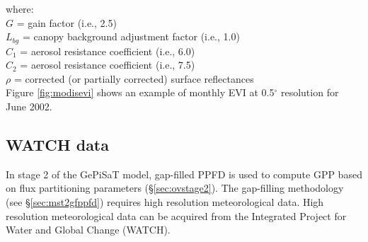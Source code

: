 \noindent where:\\
\indent $G$ = gain factor (i.e., 2.5)\\
\indent $L_{bg}$ = canopy background adjustment factor (i.e., 1.0)\\
\indent $C_{1}$ = aerosol resistance coefficient (i.e., 6.0)\\
\indent $C_{2}$ = aerosol resistance coefficient (i.e., 7.5)\\
\indent $\rho$ = corrected (or partially corrected) surface reflectances\\

\noindent Figure \ref{fig:modisevi} shows an example of monthly EVI at 0.5$^{\circ}$ resolution for June 2002. 

\subsection{WATCH data}
\label{sec:gepwatch}
In stage 2 of the GePiSaT model, gap-filled PPFD is used to compute GPP based on flux partitioning parameters (\S \ref{sec:ovstage2}).  
The gap-filling methodology (see \S \ref{sec:mst2gfppfd}) requires high resolution meteorological data.  
High resolution meteorological data can be acquired from the Integrated Project for Water and Global Change (WATCH\footnotemark {}).  

